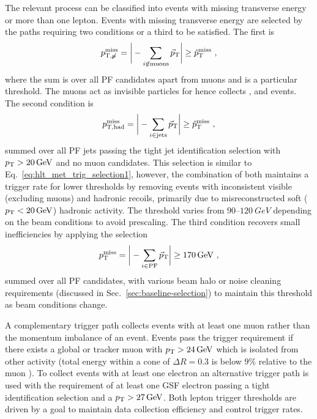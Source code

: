 The relevant process can be classified into events with missing transverse energy or more than one lepton. Events with missing transverse energy are selected by the \SWT paths requiring two conditions or a third to be satisfied. The first is
%
\begin{equation}\label{eq:hlt_met_trig_selection1}
    p_{\text{T,}\not\mu}^{\mathrm{miss}} = \bigg| -\sum_{i\not\in\mathrm{muons}} \vec{p}_{\mathrm{T}} \bigg| \ge \hat{p}_{\text{T}}^{\mathrm{miss}}\ ,
\end{equation}
%
where the sum is over all PF candidates apart from muons and \ptmissthresh is a particular threshold. The muons act as invisible particles for \ptmissnomu hence collects \IZvv, \IWmv and \IDYmm events. The second condition is
%
\begin{equation}
    p_{\mathrm{T,had}}^{\mathrm{miss}} = \bigg| -\sum_{i\in\mathrm{jets}} \vec{p}_{\mathrm{T}} \bigg| \ge \ptmissthresh\ ,
\end{equation}
%
summed over all PF jets passing the tight jet identification selection with ${p_{\text{T}}>\SI{20}{GeV}}$ and no muon candidates. This selection is similar to Eq.~\ref{eq:hlt_met_trig_selection1}, however, the combination of both maintains a trigger rate for lower \ptmissthresh  thresholds by removing events with inconsistent visible (excluding muons) and hadronic recoils, primarily due to misreconstructed soft (${p_{\text{T}}<\SI{20}{GeV}}$) hadronic activity. The threshold \ptmissthresh varies from {$90$--$\SI{120}{GeV}$} depending on the \LHC beam conditions to avoid prescaling. The third condition recovers small inefficiencies by applying the selection
%
\begin{equation}
    p_{\text{T}}^{\mathrm{miss}} = \bigg| -\sum_{i\in\mathrm{PF}} \vec{p}_{\mathrm{T}} \bigg| \ge \SI{170}{GeV}\ ,
\end{equation}
%
summed over all PF candidates, with various beam halo or \HCAL noise cleaning requirements (discussed in Sec.~\ref{sec:baseline-selection}) to maintain this threshold as beam conditions change.

A complementary trigger path collects events with at least one muon rather than the momentum imbalance of an event. Events pass the trigger requirement if there exists a global or tracker muon with ${p_{\text{T}}>\SI{24}{GeV}}$ which is isolated from other activity (total energy within a cone of $\Delta R=0.3$ is below $9\%$ relative to the muon \pt). To collect events with at least one electron an alternative trigger path is used with the requirement of at least one GSF electron passing a tight identification selection and a ${p_{\text{T}}>\SI{27}{GeV}}$. Both lepton trigger thresholds are driven by a goal to maintain data collection efficiency and control trigger rates.


